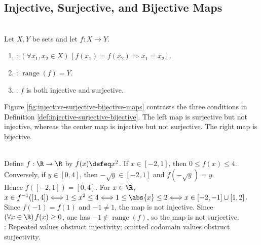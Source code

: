 \subsection{Injective, Surjective, and Bijective Maps}

\begin{definition} \label{def:injective-surjective-bijective} \\
Let $X,Y$ be sets and let $f:X\to Y$.
\begin{enumerate}[label=(\roman*)]
\setlength{\itemsep}{0pt}
\item {}: $(\forall x_1,x_2\in X)\,[f(x_1)=f(x_2)\Longrightarrow x_1=x_2]$.
\item {}: $\operatorname{range}(f)=Y$.
\item {}: $f$ is both injective and surjective.
\end{enumerate}
\end{definition}

\begin{illustrationfigure}[H]
  \centering
  
  \caption{Left: surjective with a collision; center: injective but not surjective; right: bijective.}
  \label{fig:injective-surjective-bijective-maps}
\end{illustrationfigure}

Figure \ref{fig:injective-surjective-bijective-maps} contrasts the three conditions in Definition \ref{def:injective-surjective-bijective}. The left map is surjective but not injective, whereas the center map is injective but not surjective. The right map is bijective.

\begin{example} \label{ex:square-map-image-preimage} \\
Define $f:\R\to\R$ by $f(x)\defeq x^2$. If $x\in[-2,1]$, then $0\leq f(x)\leq4$. Conversely, if $y\in[0,4]$, then $-\sqrt{y}\in[-2,1]$ and $f(-\sqrt{y})=y$.\\
Hence $f([-2,1])=[0,4]$. For $x\in\R$, $x\in f^{-1}([1,4])\Longleftrightarrow1\leq x^2\leq4\Longleftrightarrow1\leq\abs{x}\leq2\Longleftrightarrow x\in[-2,-1]\cup[1,2]$.\\
Since $f(-1)=f(1)$ and $-1\neq1$, the map is not injective. Since $(\forall x\in\R)\,f(x)\geq0$, one has $-1\notin\operatorname{range}(f)$, so the map is not surjective.\\
: Repeated values obstruct injectivity; omitted codomain values obstruct surjectivity.
\end{example}
